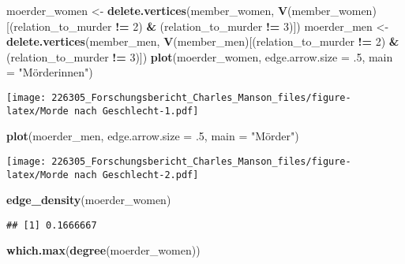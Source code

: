 \documentclass[
]{article}
\newenvironment{Shaded}{\begin{snugshade}}{\end{snugshade}}
\newcommand{\DataTypeTok}[1]{\textcolor[rgb]{0.13,0.29,0.53}{#1}}
\newcommand{\DecValTok}[1]{\textcolor[rgb]{0.00,0.00,0.81}{#1}}
\newcommand{\FloatTok}[1]{\textcolor[rgb]{0.00,0.00,0.81}{#1}}
\newcommand{\KeywordTok}[1]{\textcolor[rgb]{0.13,0.29,0.53}{\textbf{#1}}}
\newcommand{\NormalTok}[1]{#1}
\newcommand{\OperatorTok}[1]{\textcolor[rgb]{0.81,0.36,0.00}{\textbf{#1}}}
\newcommand{\StringTok}[1]{\textcolor[rgb]{0.31,0.60,0.02}{#1}}
\begin{document}
\begin{Shaded}
\begin{Highlighting}[]
\NormalTok{moerder_women <-}
\StringTok{  }\KeywordTok{delete.vertices}\NormalTok{(member_women, }\KeywordTok{V}\NormalTok{(member_women)[(relation_to_murder }\OperatorTok{!=}\StringTok{ }\DecValTok{2}\NormalTok{) }\OperatorTok{&}
\StringTok{                                                  }\NormalTok{(relation_to_murder }\OperatorTok{!=}\StringTok{ }\DecValTok{3}\NormalTok{)])}
\NormalTok{moerder_men <-}
\StringTok{  }\KeywordTok{delete.vertices}\NormalTok{(member_men, }\KeywordTok{V}\NormalTok{(member_men)[(relation_to_murder }\OperatorTok{!=}\StringTok{ }\DecValTok{2}\NormalTok{) }\OperatorTok{&}
\StringTok{                                              }\NormalTok{(relation_to_murder }\OperatorTok{!=}\StringTok{ }\DecValTok{3}\NormalTok{)])}
\KeywordTok{plot}\NormalTok{(moerder_women, }\DataTypeTok{edge.arrow.size =} \FloatTok{.5}\NormalTok{, }\DataTypeTok{main =} \StringTok{"Mörderinnen"}\NormalTok{)}
\end{Highlighting}
\end{Shaded}

\texttt{[image: 226305\_Forschungsbericht\_Charles\_Manson\_files/figure-latex/Morde nach Geschlecht-1.pdf]}

\begin{Shaded}
\begin{Highlighting}[]
\KeywordTok{plot}\NormalTok{(moerder_men, }\DataTypeTok{edge.arrow.size =} \FloatTok{.5}\NormalTok{, }\DataTypeTok{main =} \StringTok{"Mörder"}\NormalTok{)}
\end{Highlighting}
\end{Shaded}

\texttt{[image: 226305\_Forschungsbericht\_Charles\_Manson\_files/figure-latex/Morde nach Geschlecht-2.pdf]}

\begin{Shaded}
\begin{Highlighting}[]
\KeywordTok{edge_density}\NormalTok{(moerder_women)}
\end{Highlighting}
\end{Shaded}

\begin{verbatim}
## [1] 0.1666667
\end{verbatim}

\begin{Shaded}
\begin{Highlighting}[]
\KeywordTok{which.max}\NormalTok{(}\KeywordTok{degree}\NormalTok{(moerder_women))}
\end{Highlighting}
\end{Shaded}
\end{document}
